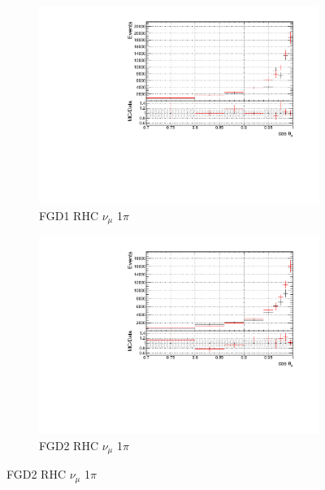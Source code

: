 \begin{figure}[!h]
\begin{subfigure}{0.49\textwidth}
  \centering
  \includegraphics[width=\textwidth]{figs/prioronly1D_t_FGD1_NuMuBkg_CC1pi_in_AntiNu_Mode}
  \caption{FGD1 RHC $\nu_{\mu}$ 1$\pi$}
\end{subfigure}
\begin{subfigure}{0.49\textwidth}
  \centering
  \includegraphics[width=\textwidth]{figs/prioronly1D_t_FGD2_NuMuBkg_CC1pi_in_AntiNu_Mode}
  \caption{FGD2 RHC $\nu_{\mu}$ 1$\pi$}
\end{subfigure}


\end{figure}
